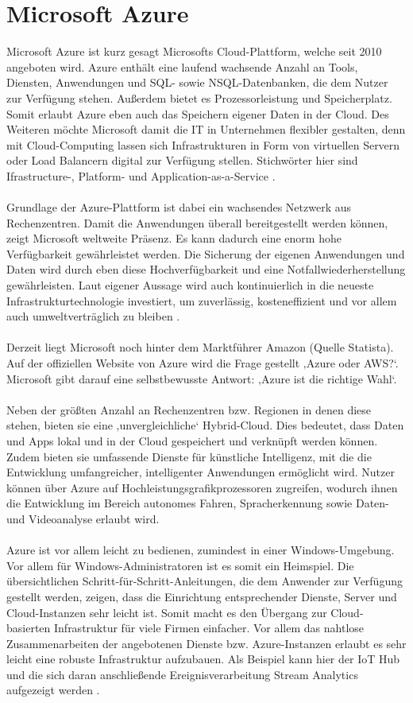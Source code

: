 \section{Microsoft Azure}
Microsoft Azure ist kurz gesagt Microsofts Cloud-Plattform, welche seit 2010 angeboten wird. Azure enthält eine laufend wachsende Anzahl an Tools, Diensten, Anwendungen und SQL- sowie NSQL-Datenbanken, die dem Nutzer zur Verfügung stehen. Außerdem bietet es Prozessorleistung und Speicherplatz. Somit erlaubt Azure eben auch das Speichern eigener Daten in der Cloud. Des Weiteren möchte Microsoft damit die IT in Unternehmen flexibler gestalten, denn mit Cloud-Computing lassen sich Infrastrukturen in Form von virtuellen Servern oder Load Balancern digital zur Verfügung stellen. Stichwörter hier sind Ifrastructure-, Platform- und Application-as-a-Service \cite{Klein.2017}.\\ \\
Grundlage der Azure-Plattform ist dabei ein wachsendes Netzwerk aus Rechenzentren. Damit die Anwendungen überall bereitgestellt werden können, zeigt Microsoft weltweite Präsenz. Es kann dadurch eine enorm hohe Verfügbarkeit gewährleistet werden. Die Sicherung der eigenen Anwendungen und Daten wird durch eben diese Hochverfügbarkeit und eine Notfallwiederherstellung gewährleisten. Laut eigener Aussage wird auch kontinuierlich in die neueste Infrastrukturtechnologie investiert, um zuverlässig, kosteneffizient und vor allem auch umweltverträglich zu bleiben \cite{Klein.2017}.\\ \\
Derzeit liegt Microsoft noch hinter dem Marktführer Amazon (Quelle Statista). Auf der offiziellen Website von Azure wird die Frage gestellt ‚Azure oder AWS?‘. Microsoft gibt darauf eine selbstbewusste Antwort: ‚Azure ist die richtige Wahl‘.\\ \\ 
Neben der größten Anzahl an Rechenzentren bzw. Regionen in denen diese stehen, bieten sie eine ‚unvergleichliche‘ Hybrid-Cloud. Dies bedeutet, dass Daten und Apps lokal und in der Cloud gespeichert und verknüpft werden können. Zudem bieten sie umfassende Dienste für künstliche Intelligenz, mit die die Entwicklung umfangreicher, intelligenter Anwendungen ermöglicht wird. Nutzer können über Azure auf Hochleistungsgrafikprozessoren zugreifen, wodurch ihnen die Entwicklung im Bereich autonomes Fahren, Spracherkennung sowie Daten- und Videoanalyse erlaubt wird.\\ \\
Azure ist vor allem leicht zu bedienen, zumindest in einer Windows-Umgebung. Vor allem für Windows-Administratoren ist es somit ein Heimspiel. Die übersichtlichen Schritt-für-Schritt-Anleitungen, die dem Anwender zur Verfügung gestellt werden, zeigen, dass die Einrichtung entsprechender Dienste, Server und Cloud-Instanzen sehr leicht ist. Somit macht es den Übergang zur Cloud-basierten Infrastruktur für viele Firmen einfacher. Vor allem das nahtlose Zusammenarbeiten der angebotenen Dienste bzw. Azure-Instanzen erlaubt es sehr leicht eine robuste Infrastruktur aufzubauen. Als Beispiel kann hier der IoT Hub und die sich daran anschließende Ereignisverarbeitung Stream Analytics aufgezeigt werden \cite{PeterTsai.2016}.\\ \\
